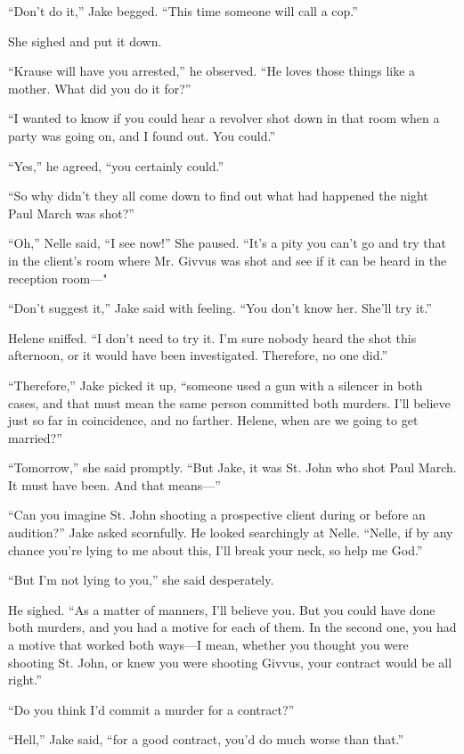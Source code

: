 \documentclass{novel}
\begin{document}
“Don’t do it,” Jake begged. “This time someone will call a cop.”

She sighed and put it down.

“Krause will have you arrested,” he observed. “He loves those things like a mother. What did you do it for?”

“I wanted to know if you could hear a revolver shot down in that room when a party was going on, and I found out. You could.”

“Yes,” he agreed, “you certainly could.”

“So why didn’t they all come down to find out what had happened the night Paul March was shot?”

“Oh,” Nelle said, “I see now!” She paused. “It’s a pity you can’t go and try that in the client’s room where Mr. Givvus was shot and see if it can be heard in the reception room—"

“Don’t suggest it,” Jake said with feeling. “You don’t know her. She’ll try it.”

Helene sniffed. “I don’t need to try it. I’m sure nobody heard the shot this afternoon, or it would have been investigated. Therefore, no one did.”

“Therefore,” Jake picked it up, “someone used a gun with a silencer in both cases, and that must mean the same person committed both murders. I’ll believe just so far in coincidence, and no farther. Helene, when are we going to get married?”

“Tomorrow,” she said promptly. “But Jake, it was St. John who shot Paul March. It must have been. And that means—”

“Can you imagine St. John shooting a prospective client during or before an audition?” Jake asked scornfully. He looked searchingly at Nelle. “Nelle, if by any chance you’re lying to me about this, I’ll break your neck, so help me God.”

“But I’m not lying to you,” she said desperately.

He sighed. “As a matter of manners, I’ll believe you. But you could have done both murders, and you had a motive for each of them. In the second one, you had a motive that worked both ways—I mean, whether you thought you were shooting St. John, or knew you were shooting Givvus, your contract would be all right.”

“Do you think I’d commit a murder for a contract?”

“Hell,” Jake said, “for a good contract, you’d do much worse than that.”
\end{document}
